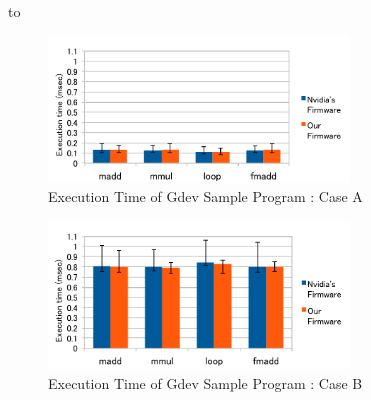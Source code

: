 
\begin{table}[tb]
\caption{Evaluate Environment} 
\label{tab:environment}
\hbox to

\end{table}

\begin{figure}
\begin{center}
\hfil
\includegraphics[width=8cm]{./img/good_case.pdf}
\end{center}
\caption{Execution Time of Gdev Sample Program : Case A}
\label{fig:goodcase}
\end{figure}

\begin{figure}
\begin{center}
\includegraphics[width=8cm]{./img/bad_case.pdf}
\end{center}
\caption{Execution Time of Gdev Sample Program : Case B}
\label{fig:badcase}
\end{figure}



